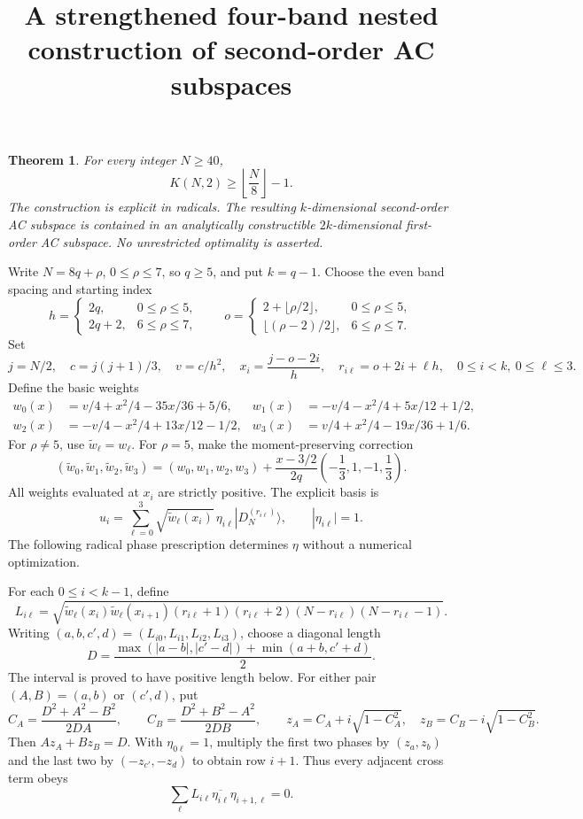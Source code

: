 \documentclass[11pt]{article}
\newtheorem{theorem}{Theorem}
\begin{document}
\title{A strengthened four-band nested construction of second-order AC subspaces}
\author{}\date{}\maketitle

\begin{theorem}
For every integer $N\ge40$,
\[
 \boxed{K(N,2)\ge\left\lfloor\frac N8\right\rfloor-1.}
\]
The construction is explicit in radicals. The resulting $k$-dimensional
second-order AC subspace is contained in an analytically constructible
$2k$-dimensional first-order AC subspace. No unrestricted optimality is asserted.
\end{theorem}

Write $N=8q+\rho$, $0\le\rho\le7$, so $q\ge5$, and put $k=q-1$.
Choose the even band spacing and starting index
\[
 h=\begin{cases}2q,&0\le\rho\le5,\\2q+2,&6\le\rho\le7,\end{cases}
 \qquad
 o=\begin{cases}2+\lfloor\rho/2\rfloor,&0\le\rho\le5,\\
                 \lfloor(\rho-2)/2\rfloor,&6\le\rho\le7.
    \end{cases}
\]
Set
\[
 j=N/2,\quad c=j(j+1)/3,\quad v=c/h^2,\quad
 x_i=\frac{j-o-2i}{h},\quad r_{i\ell}=o+2i+\ell h,
 \quad0\le i<k,\ 0\le\ell\le3.
\]
Define the basic weights
\begin{align*}
 w_0(x)&=v/4+x^2/4-35x/36+5/6,&
 w_1(x)&=-v/4-x^2/4+5x/12+1/2,\\
 w_2(x)&=-v/4-x^2/4+13x/12-1/2,&
 w_3(x)&=v/4+x^2/4-19x/36+1/6.
\end{align*}
For $\rho\ne5$, use $\widetilde w_\ell=w_\ell$.
For $\rho=5$, make the moment-preserving correction
\[
 (\widetilde w_0,\widetilde w_1,\widetilde w_2,\widetilde w_3)
 =(w_0,w_1,w_2,w_3)
 +\frac{x-3/2}{2q}\left(-\frac13,1,-1,\frac13\right).
\]
All weights evaluated at $x_i$ are strictly positive. The explicit basis is
\[
 u_i=\sum_{\ell=0}^3\sqrt{\widetilde w_\ell(x_i)}\,
 \eta_{i\ell}|D_N^{(r_{i\ell})}\rangle,
 \qquad |\eta_{i\ell}|=1.
\]
The following radical phase prescription determines $\eta$ without a
numerical optimization.

For each $0\le i<k-1$, define
\[
 L_{i\ell}=\sqrt{\widetilde w_\ell(x_i)\widetilde w_\ell(x_{i+1})
 (r_{i\ell}+1)(r_{i\ell}+2)(N-r_{i\ell})(N-r_{i\ell}-1)}.
\]
Writing $(a,b,c',d)=(L_{i0},L_{i1},L_{i2},L_{i3})$, choose a diagonal length
\[
 D=\frac{\max(|a-b|,|c'-d|)+\min(a+b,c'+d)}{2}.
\]
The interval is proved to have positive length below. For either pair
$(A,B)=(a,b)$ or $(c',d)$, put
\[
 C_A=\frac{D^2+A^2-B^2}{2DA},\qquad
 C_B=\frac{D^2+B^2-A^2}{2DB},\qquad
 z_A=C_A+i\sqrt{1-C_A^2},\quad z_B=C_B-i\sqrt{1-C_B^2}.
\]
Then $Az_A+Bz_B=D$. With $\eta_{0\ell}=1$, multiply the first two phases
by $(z_a,z_b)$ and the last two by $(-z_{c'},-z_d)$ to obtain row $i+1$.
Thus every adjacent cross term obeys
\[
 \sum_\ell L_{i\ell}\overline{\eta_{i\ell}}\eta_{i+1,\ell}=0.
\]
\end{document}

